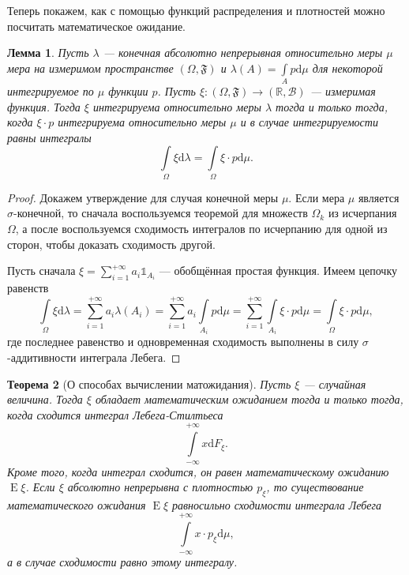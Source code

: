 \documentclass[12pt]{article}
\newtheorem{theorem}{Теорема}
\newtheorem{lemma}[theorem]{Лемма}
\numberwithin{theorem}{section}
\theoremstyle{definition}
\newcommand{\RR}{\mathbb{R}}
\newcommand{\calB}{\mathcal{B}}
\newcommand{\events}{\mathfrak{F}}
\newcommand{\expect}{\operatorname{E}}
\newcommand{\ind}{\mathds{1}}
\newcommand{\diff}{\mathrm{d}}
\begin{document}
	Теперь покажем, как с помощью функций распределения и плотностей можно посчитать математическое ожидание.
	
	\begin{lemma} \label{absolutely continuous change of variable}
		Пусть $ \lambda $ --- конечная абсолютно непрерывная относительно меры $ \mu $ мера на измеримом пространстве
		$ (\Omega,\events) $ и $ \lambda(A) = \int\limits_{A} p\diff\mu $ для некоторой интегрируемое
		по $ \mu $ функции $ p $. 
		Пусть $ \xi \colon (\Omega, \events) \to (\RR,\calB) $ 
		--- измеримая функция. Тогда $ \xi $ интегрируема относительно меры $ \lambda $
		тогда и только тогда, когда $ \xi \cdot p $ интегрируема относительно меры $ \mu $
		и в случае интегрируемости равны интегралы
		$$ \int\limits_{\Omega} \xi\diff \lambda = \int\limits_{\Omega} \xi \cdot p \diff\mu. $$
	\end{lemma}
	
	\begin{proof}
		Докажем утверждение для случая конечной меры $ \mu $. Если мера $ \mu $ является $ \sigma $-конечной,
		то сначала воспользуемся теоремой для множеств $ \Omega_k $ из исчерпания $ \Omega $,
		а после воспользуемся сходимость интегралов по исчерпанию для одной из сторон, чтобы доказать сходимость другой.
		
		Пусть сначала $ \xi = \sum\limits_{i = 1}^{+\infty} a_i\ind_{A_i} $ --- обобщённая простая функция.
		Имеем цепочку равенств 
		$$ \int\limits_{\Omega} \xi \diff\lambda 
		= \sum\limits_{i = 1}^{+\infty} a_i \lambda(A_i) 
		= \sum\limits_{i = 1}^{+\infty} a_i \int\limits_{A_i} p\diff\mu
		= \sum\limits_{i = 1}^{+\infty} \int\limits_{A_i} \xi \cdot p\diff\mu
		= \int\limits_{\Omega} \xi \cdot p \diff\mu, $$
		где последнее равенство и одновременная сходимость выполнены в силу $ \sigma $-аддитивности интеграла Лебега.
	\end{proof}
	
	\begin{theorem}[О способах вычислении матожидания] \label{compute expectation}
		Пусть $ \xi $ --- случайная величина.
		Тогда $ \xi $ обладает математическим ожиданием тогда и только тогда,
		когда сходится интеграл Лебега-Стилтьеса
		$$ \int\limits_{-\infty}^{+\infty} x\diff F_{\xi}. $$
		Кроме того, когда интеграл сходится, он равен математическому ожиданию $ \expect\xi $.
		Если $ \xi $ абсолютно непрерывна с плотностью $ p_\xi $,
		то существование математического ожидания $ \expect\xi $ равносильно сходимости интеграла Лебега
		$$ \int\limits_{-\infty}^{+\infty} x \cdot p_\xi\diff \mu, $$
		а в случае сходимости равно этому интегралу.
	\end{theorem}
	
\end{document}
